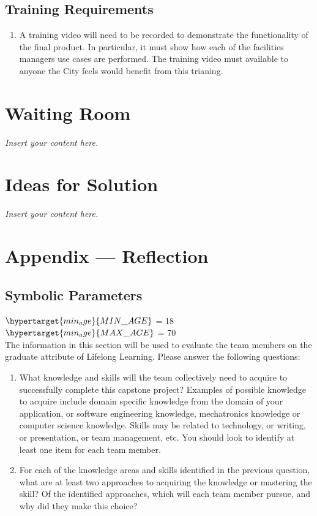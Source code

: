 \documentclass[12pt]{article}
\newcommand{\lips}{\textit{Insert your content here.}}
\begin{document}
\subsection{Training Requirements}
\begin{enumerate} [{UDT-TR}1.]
\item A training video will need to be recorded to demonstrate the
functionality of the final product. In particular, it must show how each of 
the facilities managers use cases are performed. The training video must available to
anyone the City feels would benefit from this trianing.
\end{enumerate}

\section{Waiting Room}
\lips

\section{Ideas for Solution}
\lips

\newpage{}
\section*{Appendix --- Reflection}
\subsection{Symbolic Parameters}
$\hypertarget{min_age}{MIN\_AGE}$ = 18\\
$\hypertarget{min_age}{MAX\_AGE}$ = 70\\

The information in this section will be used to evaluate the team members on the
graduate attribute of Lifelong Learning.  Please answer the following questions:

\begin{enumerate}
  \item What knowledge and skills will the team collectively need to acquire to
  successfully complete this capstone project?  Examples of possible knowledge
  to acquire include domain specific knowledge from the domain of your
  application, or software engineering knowledge, mechatronics knowledge or
  computer science knowledge.  Skills may be related to technology, or writing,
  or presentation, or team management, etc.  You should look to identify at
  least one item for each team member.
  \item For each of the knowledge areas and skills identified in the previous
  question, what are at least two approaches to acquiring the knowledge or
  mastering the skill?  Of the identified approaches, which will each team
  member pursue, and why did they make this choice?
\end{enumerate}
\end{document}
